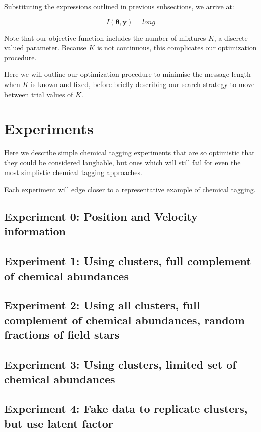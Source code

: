 \documentclass{aastex61}
\newcommand{\vect}[1]{\boldsymbol{\mathbf{#1}}}
\def\vectheta{\vect{\theta}}
\def\datum{y}
\def\data{\vect{\datum}}
\begin{document}
Substituting the expressions outlined in previous subsections, we arrive at:

\begin{equation}
  I(\vectheta,\data) = long
\end{equation}

Note that our objective function includes the number of mixtures $K$, a
discrete valued parameter. 
Because $K$ is not continuous, this complicates our optimization procedure.


Here we will outline our optimization procedure to minimise the message length
when $K$ is known and fixed, before briefly describing our search strategy to
move between trial values of $K$.



\section{Experiments}
\label{sec:experiments}

Here we describe simple chemical tagging experiments that are so optimistic
that they could be considered laughable, but ones which will still fail for
even the most simplistic chemical tagging approaches.

Each experiment will edge closer to a representative example of chemical
tagging.

\subsection{Experiment 0: Position and Velocity information}

\subsection{Experiment 1: Using clusters, full complement of chemical abundances}

\subsection{Experiment 2: Using all clusters, full complement of chemical abundances, random fractions of field stars}

\subsection{Experiment 3: Using clusters, limited set of chemical abundances}

\subsection{Experiment 4: Fake data to replicate clusters, but use latent factor}
\end{document}
